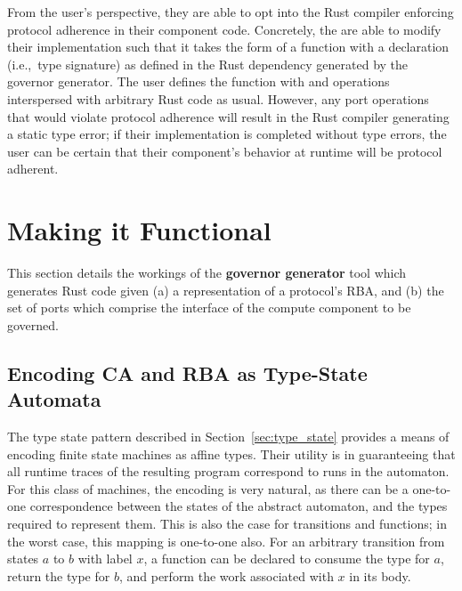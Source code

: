 From the user's perspective, they are able to opt into the Rust compiler enforcing protocol adherence in their component code. Concretely, the are able to modify their implementation such that it takes the form of a function with a declaration (i.e.,\ type signature) as defined in the Rust dependency generated by the governor generator. The user defines the function with  and  operations interspersed with arbitrary Rust code as usual. However, any port operations that would violate protocol adherence will result in the Rust compiler generating a static type error; if their implementation is completed without type errors, the user can be certain that their component's behavior at runtime will be protocol adherent.

\section{Making it Functional}
\label{sec:making_it_functional}
This section details the workings of the \textbf{governor generator} tool which generates Rust code given (a) a representation of a protocol's RBA, and (b) the set of ports which comprise the interface of the compute component to be governed.

\subsection{Encoding CA and RBA as Type-State Automata}
\label{sec:type_space_automaton}
The type state pattern described in Section~\ref{sec:type_state} provides a means of encoding finite state machines as affine types. Their utility is in guaranteeing that all runtime traces of the resulting program correspond to runs in the automaton. For this class of machines, the encoding is very natural, as there can be a one-to-one correspondence between the states of the abstract automaton, and the types required to represent them. This is also the case for transitions and functions; in the worst case, this mapping is one-to-one also. For an arbitrary transition from states $a$ to $b$ with label $x$, a function can be declared to consume the type for $a$, return the type for $b$, and perform the work associated with $x$ in its body. 

